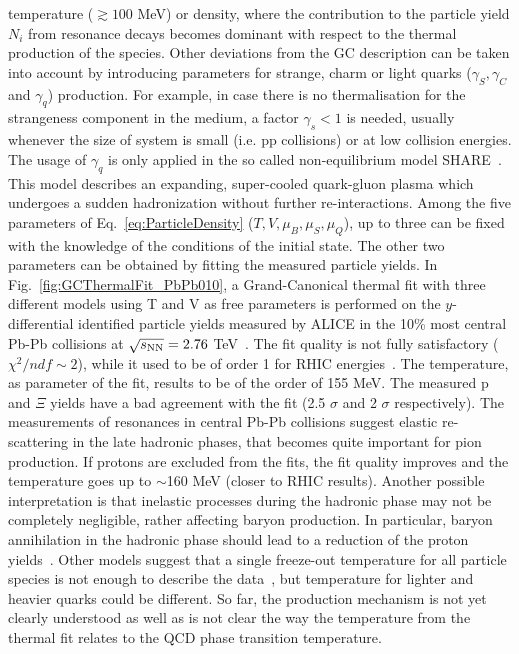 temperature ($\gtrsim 100 $ MeV) or density, where the contribution 
to the particle yield $N_{i}$ from resonance decays becomes 
dominant with respect to the thermal production of the species. 
Other deviations from the GC description can be taken into 
account by introducing parameters for strange, charm or 
light quarks ($\gamma_{S}, \gamma_{C}$ and $\gamma_{q}$) 
production. For example, in case there is no thermalisation for 
the strangeness component in the medium, a factor 
$\gamma_{s}<1$ is needed, usually whenever the size of system 
is small (i.e. pp collisions) or at low collision energies. 
The usage of $\gamma_{q}$ is only applied in the so called 
non-equilibrium model SHARE~\cite{Petran:2013lja}. This model 
describes an expanding, super-cooled quark-gluon plasma which 
undergoes a sudden hadronization without further re-interactions.
Among the five parameters of Eq.~\ref{eq:ParticleDensity} 
($T, V, \mu_B, \mu_S, \mu_Q$), up to three can be fixed with
 the knowledge of the conditions of the initial state. 
 The other two parameters can be obtained by fitting the measured
  particle yields. In Fig.~\ref{fig:GCThermalFit_PbPb010}, a 
  Grand-Canonical thermal fit with three different models using 
  T and V as free parameters is performed on the $y$-differential 
  identified particle yields measured by ALICE in the 10\% most 
  central Pb-Pb collisions at $\sqrt{s_{\rm NN}} = 2.76$ TeV~\cite{Floris:2014pta}. 
  The fit quality is not fully satisfactory ($\chi^{2}/ndf \sim 2$), 
  while it used to be of order 1 for RHIC energies~\cite{Andronic:2008gu}. 
  The temperature, as parameter of the fit, results to be of the order of 155 MeV. 
The measured p and $\Xi$ yields have a bad agreement with the fit 
(2.5 $\sigma$ and 2 $\sigma$ respectively). The measurements of resonances 
in central Pb-Pb collisions suggest elastic re-scattering in the late 
hadronic phases, that becomes quite important for pion production. 
If protons are excluded from the fits, the fit quality improves and the 
temperature goes up to $\sim$160 MeV (closer to RHIC results). 
Another possible
interpretation is that inelastic processes during the hadronic phase may
not be completely negligible, rather affecting baryon production. In 
particular, baryon annihilation in the hadronic phase should lead
to a reduction of the proton yields~\cite{Becattini:2014hla,Becattini:2012xb}. Other models 
suggest that a single freeze-out temperature for all particle species is not enough to describe
 the data~\cite{Bellwied:2013cta}, but temperature for lighter and heavier
  quarks could be different. So far, the production mechanism is not yet 
  clearly understood as well as is not clear the way the temperature from the thermal 
  fit relates to the QCD phase transition temperature.
  
